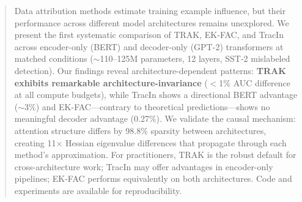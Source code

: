 \begin{abstract}
Data attribution methods estimate training example influence, but their performance across different model architectures remains unexplored. We present the first systematic comparison of TRAK, EK-FAC, and TracIn across encoder-only (BERT) and decoder-only (GPT-2) transformers at matched conditions ($\sim$110--125M parameters, 12 layers, SST-2 mislabeled detection). Our findings reveal architecture-dependent patterns: \textbf{TRAK exhibits remarkable architecture-invariance} ($<$1\% AUC difference at all compute budgets), while TracIn shows a directional BERT advantage ($\sim$3\%) and EK-FAC---contrary to theoretical predictions---shows no meaningful decoder advantage (0.27\%). We validate the causal mechanism: attention structure differs by 98.8\% sparsity between architectures, creating 11$\times$ Hessian eigenvalue differences that propagate through each method's approximation. For practitioners, TRAK is the robust default for cross-architecture work; TracIn may offer advantages in encoder-only pipelines; EK-FAC performs equivalently on both architectures. Code and experiments are available for reproducibility.
\end{abstract}
